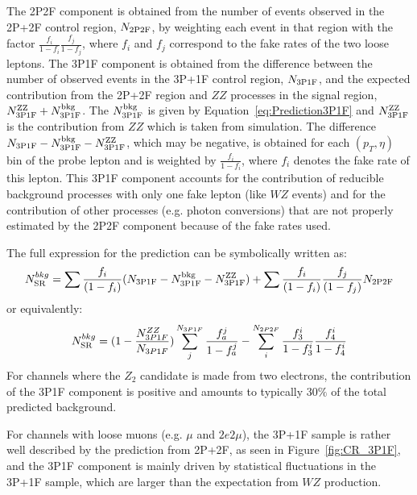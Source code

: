 The 2P2F component is obtained from the number of
  events observed in the 2P+2F control region, $N_{\rm 2P2F}$, by
  weighting each event in that region with the factor
  $\frac{f_{i}}{1-f_{i}} \frac{f_{j}}{1-f_{j}}$, where $f_{i}$ and
  $f_{j}$ correspond to the fake rates of the two loose leptons.
The 3P1F component is obtained from the
   difference between the number of observed events in the 3P+1F control
   region, $N_{\rm 3P1F}$, and the expected contribution from the 2P+2F
   region and $ZZ$ processes in the signal region, $N^{\rm ZZ}_{\rm 3P1F} +
   N^{\rm bkg}_{\rm 3P1F}$. The $N^{\rm bkg}_{\rm 3P1F}$ is given by 
   Equation~\ref{eq:Prediction3P1F} and $N^{\rm ZZ}_{\rm 3P1F}$ is the
   contribution from $ZZ$ which is taken from simulation. 
   The difference $N_{\rm 3P1F} -  N^{\rm bkg}_{\rm 3P1F} - N^{\rm ZZ}_{\rm 3P1F}$,
   which may be negative,
   is obtained for each $(p_T, \eta)$ bin of the probe lepton and is weighted 
   by $\frac{f_i} {1 - f_i}$, where $f_i$ denotes the fake rate of
   this lepton.
   This 3P1F component accounts for the contribution of reducible background
   processes with only one fake lepton (like $WZ$ events) and for the contribution
   of other processes (e.g. photon conversions) that are not properly estimated
   by the 2P2F component because of the fake rates used.

The full expression for the prediction can be symbolically written as:
%
\begin{equation} 
\label{eq:PredictionSR}
N^{bkg}_{\rm SR} = \sum \frac{f_{i}}{(1-f_{i})} (N_{\rm 3P1F} - N^{\rm
bkg}_{\rm 3P1F} - N^{\rm ZZ}_{\rm 3P1F})
+ \sum \frac{f_{i}}{(1-f_{i})} \frac{f_{j}}{(1-f_{j})}N_{\rm 2P2F} \end{equation}
or equivalently:
\begin{equation}
\label{eq:PredictionSR2}
N^{bkg}_{\rm SR}= (1-\frac{N_{3P1F}^{ZZ}}{N_{3P1F}})\sum_j^{N_{3P1F}}\frac{f_a^j}{1-f_a^j} - \sum_i^{N_{2P2F}}\frac{f_3^i}{1-f_3^i}\frac{f_4^i}{1-f_4^i}
\end{equation}
For channels where the $Z_2$ candidate is made from two electrons, 
the contribution of the 3P1F component is 
positive and amounts to typically $30 \%$ of the total predicted background.

For channels with loose muons (e.g. $\mu$ and $2e2\mu$), the 3P+1F sample is rather well described by
the prediction from 2P+2F, as seen in Figure~\ref{fig:CR_3P1F}, and the
3P1F component is mainly driven by statistical fluctuations in the 3P+1F sample,
which are larger than the expectation from $WZ$ production.


